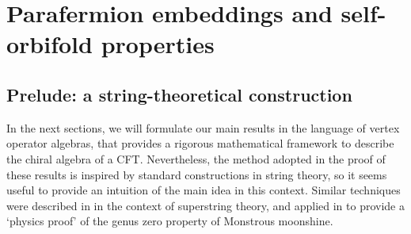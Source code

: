 \documentclass[11pt,reqno]{article}
\newcommand{\be}{\begin{equation}}
\newcommand{\ee}{\end{equation}}
\newcommand{\ZZ}{\mathbb{Z}}
\newcommand{\paraf}{\mathcal{P}}
\newcommand{\kmalg}[1]{\mathfrak{#1}}
\newcommand{\alg}[1]{\mathfrak{#1}}
\begin{document}
%
%
%
%

\section{Parafermion embeddings and self-orbifold properties }\label{s:mainth}

\subsection{Prelude: a string-theoretical construction}

In the next sections, we will formulate our main results in the language of vertex operator algebras, that provides a rigorous mathematical framework to describe the chiral algebra of a CFT. Nevertheless, the method adopted in the proof of these results is inspired by standard constructions in string theory, so it seems useful to provide an intuition of the main idea in this context. Similar techniques were described in \cite{Persson:2015jka,Persson:2017lkn} in the context of superstring theory, and applied in \cite{Paquette:2016xoo,Paquette:2017xui} to provide a `physics proof' of the genus zero property of Monstrous moonshine.
\end{document}
